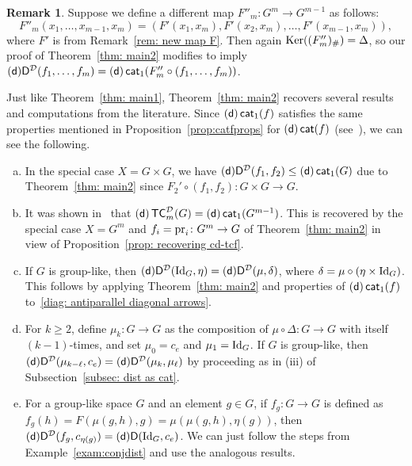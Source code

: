 \documentclass[amscd,amssymb,verbatim,10pt]{amsart}
\numberwithin{equation}{section}
\theoremstyle{plain}
\theoremstyle{definition}
\newtheorem{remark}[theorem]{Remark}
\DeclareMathOperator{\cat}{{\mathsf{cat}}}
\DeclareMathOperator{\TC}{{\mathsf{TC}}}
\DeclareMathOperator{\Ker}{{\rm Ker}}
\def\id{\protect\operatorname{Id}}
\def\pr{\protect\operatorname{pr}}
\newcommand{\D}{{\sf {D}}}
\newcommand{\sd}{{(\sf {d})}}
\newcommand{\cD}{{\mathcal{D}}}
\begin{document}
\begin{remark}
    Suppose we define a different map $F''_m\colon G^m\to G^{m-1}$ as follows:
    \[
    F''_m(x_1,\dots,x_{m-1},x_m)=(F'(x_1,x_m), F'(x_2,x_m), \dots, F'(x_{m-1},x_m)),
    \]
    where $F'$ is from Remark~\ref{rem: new map F}. Then again $\Ker((F''_m)_\#)=\Delta$, so our proof of Theorem~\ref{thm: main2} modifies to imply $\sd\D^{\cD}(f_1,\dots,f_m)=\sd\cat_1(F''_m\circ (f_1,\dots,f_m))$.
\end{remark}

Just like Theorem~\ref{thm: main1}, Theorem~\ref{thm: main2} recovers several results and computations from the literature. Since $\sd\cat_1(f)$ satisfies the same properties mentioned in Proposition~\ref{prop:catfprops} for $\sd\cat(f)$ (see~\cite{Op,OS,JO}), we can see the following.

\begin{enumerate}[(a)]
\item In the special case $X=G\times G$, we have $\sd\D^{\cD}(f_1,f_2)\le\sd\cat_1(G)$ due to Theorem~\ref{thm: main2} since $F_2'\circ (f_1,f_2)\colon G\times G\to G$.

\item It was shown in~\cite{PS,JO} that $\sd\TC_m^{\cD}(G)=\sd\cat_1(G^{m-1})$. This is recovered by the special case $X=G^m$ and $f_i=\pr_i\colon G^m\to G$ of Theorem~\ref{thm: main2} in view of Proposition~\ref{prop: recovering cd-tcf}.

\item If $G$ is group-like, then $\sd\D^{\cD}(\id_G,\eta)=\sd\D^{\cD}(\mu,\delta)$, where $\delta=\mu\circ(\eta\times\id_G)$. This follows by applying Theorem~\ref{thm: main2} and properties of $\sd\cat_1(f)$ to~\eqref{diag: antiparallel diagonal arrows}.

\item For $k\ge 2$, define $\mu_k\colon G\to G$ as the composition of $\mu\circ\Delta\colon G\to G$ with itself $(k-1)$-times, and set $\mu_0=c_e$ and $\mu_1=\id_G$. If $G$ is group-like, then $\sd\D^{\cD}(\mu_{k-\ell},c_e)=\sd\D^{\cD}(\mu_k,\mu_{\ell})$ by proceeding as in (iii) of Subsection~\ref{subsec: dist as cat}.

\item For a group-like space $G$ and an element $g\in G$, if $f_g\colon G \to G$ is defined as $f_g(h)=F(\mu(g,h),g)=\mu(\mu(g,h),\eta(g))$, then $\sd\D^{\cD}(f_g,c_{\eta(g)})=\sd\D(\id_G,c_e)$. We can just follow the steps from Example~\ref{exam:conjdist} and use the analogous results.
\end{enumerate}
\end{document}
